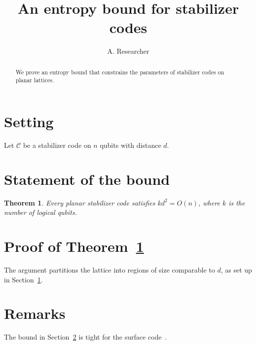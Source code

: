 \documentclass{article}
\newtheorem{theorem}{Theorem}
\begin{document}
\title{An entropy bound for stabilizer codes}
\author{A. Researcher}
\maketitle

\begin{abstract}
We prove an entropy bound that constrains the parameters of stabilizer codes on planar lattices.
\end{abstract}

\section{Setting}\label{sec:setting}
Let $\mathcal{C}$ be a stabilizer code on $n$ qubits with distance $d$.

\section{Statement of the bound}\label{sec:statement}
\begin{theorem}\label{thm:bound}
Every planar stabilizer code satisfies $k d^2 = O(n)$, where $k$ is the number of logical qubits.
\end{theorem}

\section{Proof of Theorem~\ref{thm:bound}}\label{sec:proof}
The argument partitions the lattice into regions of size comparable to $d$, as set up in Section~\ref{sec:setting}.

\section{Remarks}
The bound in Section~\ref{sec:statement} is tight for the surface code~\cite{bravyi2010}.


\end{document}
